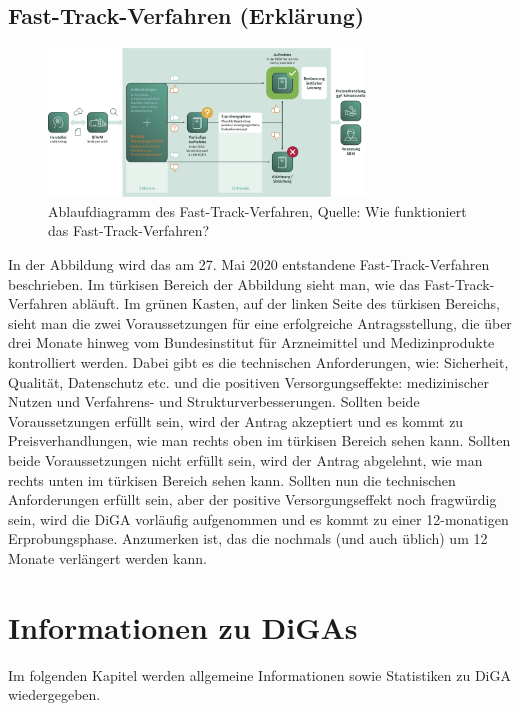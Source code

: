 \documentclass{article}
\begin{document}
		\subsection{Fast-Track-Verfahren (Erklärung)} 
			\begin{figure}[htbp]
				\centering
				\includegraphics[width=0.75\textwidth]{./grafiken/fast-track-verfahren}
				\caption[Ablaufdiagramm des Fast-Track-Verfahren]{Ablaufdiagramm des Fast-Track-Verfahren, Quelle: Wie funktioniert das Fast-Track-Verfahren? \cite{BfArM-Fast-TrackVerfahren}}
				\label{Abb-ft-Verfahren}
			\end{figure}
			In der Abbildung wird das am 27. Mai 2020 entstandene Fast-Track-Verfahren beschrieben. Im türkisen Bereich der Abbildung sieht man, wie das Fast-Track-Verfahren abläuft. Im grünen Kasten, auf der linken Seite des türkisen Bereichs, sieht man die zwei Voraussetzungen für eine erfolgreiche Antragsstellung, die über drei Monate hinweg vom Bundesinstitut für Arzneimittel und Medizinprodukte kontrolliert werden. Dabei gibt es die technischen Anforderungen, wie: Sicherheit, Qualität, Datenschutz etc. und die positiven Versorgungseffekte: medizinischer Nutzen und Verfahrens- und Strukturverbesserungen. Sollten beide Voraussetzungen erfüllt sein, wird der Antrag akzeptiert und es kommt zu Preisverhandlungen, wie man rechts oben im türkisen Bereich sehen kann. Sollten beide Voraussetzungen nicht erfüllt sein, wird der Antrag abgelehnt, wie man rechts unten im türkisen Bereich sehen kann. Sollten nun die technischen Anforderungen erfüllt sein, aber der positive Versorgungseffekt noch fragwürdig sein, wird die DiGA vorläufig aufgenommen und es kommt zu einer 12-monatigen Erprobungsphase. Anzumerken ist, das die nochmals (und auch üblich) um 12 Monate verlängert werden kann.
		\newpage
	\section{Informationen zu DiGAs}   
		Im folgenden Kapitel werden allgemeine Informationen sowie Statistiken zu DiGA wiedergegeben.
\end{document}
